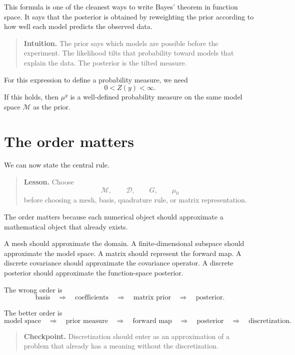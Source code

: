 \documentclass[11pt,a4paper]{book}
\newenvironment{intuition}
  {\begin{quote}\textbf{Intuition.}}
  {\end{quote}}
\newenvironment{lesson}
  {\begin{quote}\textbf{Lesson.}}
  {\end{quote}}
\newenvironment{checkpoint}
  {\begin{quote}\textbf{Checkpoint.}}
  {\end{quote}}
\newcommand{\M}{\mathcal{M}}      %
\newcommand{\D}{\mathcal{D}}      %
\newcommand{\prior}{\mu_0}
\newcommand{\post}{\mu^y}
\newcommand{\obs}{y}
\newcommand{\G}{G}
\begin{document}
This formula is one of the cleanest ways to write Bayes' theorem in function
space. It says that the posterior is obtained by reweighting the prior
according to how well each model predicts the observed data.

\begin{intuition}
The prior says which models are possible before the experiment.
The likelihood tilts that probability toward models that explain the data.
The posterior is the tilted measure.
\end{intuition}

For this expression to define a probability measure, we need
\[
    0 < Z(\obs) < \infty.
\]
If this holds, then $\post$ is a well-defined probability measure on the same
model space $\M$ as the prior.

\section{The order matters}

We can now state the central rule.

\begin{lesson}
Choose
\[
    \M,\qquad \D,\qquad \G,\qquad \prior
\]
before choosing a mesh, basis, quadrature rule, or matrix representation.
\end{lesson}

The order matters because each numerical object should approximate a
mathematical object that already exists.

A mesh should approximate the domain. A finite-dimensional subspace should
approximate the model space. A matrix should represent the forward map. A
discrete covariance should approximate the covariance operator. A discrete
posterior should approximate the function-space posterior.

The wrong order is
\[
    \text{basis}
    \quad\Rightarrow\quad
    \text{coefficients}
    \quad\Rightarrow\quad
    \text{matrix prior}
    \quad\Rightarrow\quad
    \text{posterior}.
\]

The better order is
\[
    \text{model space}
    \quad\Rightarrow\quad
    \text{prior measure}
    \quad\Rightarrow\quad
    \text{forward map}
    \quad\Rightarrow\quad
    \text{posterior}
    \quad\Rightarrow\quad
    \text{discretization}.
\]

\begin{checkpoint}
Discretization should enter as an approximation of a problem that already has a
meaning without the discretization.
\end{checkpoint}
\end{document}
